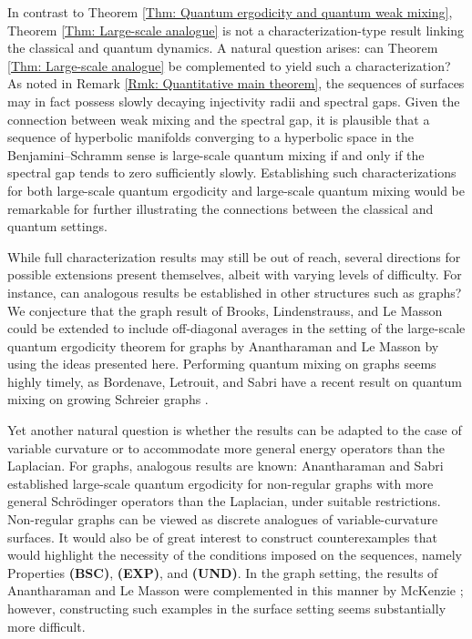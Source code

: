 \documentclass[11pt,twoside,reqno]{amsart} \usepackage{a4wide} \usepackage[T1]{fontenc} \usepackage[utf8]{inputenc} \usepackage{soul}  \usepackage{amsmath} \usepackage{amsfonts} \usepackage{amssymb} \usepackage{mathtools} \usepackage{amsthm} \usepackage{xcolor} \usepackage{graphicx} \usepackage{hyperref} \usepackage{standalone} \usepackage{esint} \usepackage{comment} \usepackage[left=2.3cm,top=3cm,right=2.3cm]{geometry} \usepackage{bm} \usepackage{svg} \usepackage{float} \numberwithin{equation}{section} \theoremstyle{plain} \newtheorem{thm}{Theorem}[section] \newtheorem{theorem}[thm]{Theorem} \newtheorem*{theorem*}{Theorem}\newtheorem{conj}[thm]{Conjecture} \newtheorem{lemma}[thm]{Lemma} \newtheorem{prop}[thm]{Proposition} \newtheorem{proposition}[thm]{Proposition} \newtheorem{cor}[thm]{Corollary} \newtheorem{question}[thm]{Question} \newtheorem{corollary}[thm]{Corollary} \newtheorem{assumption}[thm]{Assumption} \theoremstyle{definition} \newtheorem{defn}[thm]{Definition} \newtheorem{choice}[thm]{Choice} \newtheorem{definition}[thm]{Definition} \newtheorem{ex}[thm]{Example} \newtheorem{notation}[thm]{Notation} \newtheorem*{ack}{Acknowledgements} \theoremstyle{remark} \newtheorem{remark}[thm]{Remark} \newtheorem{bigremark}[thm]{Remark} \usepackage{xcolor} \newcommand{\red}[1]{ {\color{Red}#1} } \newcommand{\blue}[1]{ {\color{Blue}#1} } \author{Kai Hippi} \address{Aalto University, Espoo, Finland} \email{kai.hippi@aalto.fi}
\begin{document}
In contrast to Theorem \ref{Thm: Quantum ergodicity and quantum weak mixing}, Theorem \ref{Thm: Large-scale analogue} is not a characterization-type result linking the classical and quantum dynamics. A natural question arises: can Theorem \ref{Thm: Large-scale analogue} be complemented to yield such a characterization? As noted in Remark \ref{Rmk: Quantitative main theorem}, the sequences of surfaces may in fact possess slowly decaying injectivity radii and spectral gaps. Given the connection between weak mixing and the spectral gap, it is plausible that a sequence of hyperbolic manifolds converging to a hyperbolic space in the Benjamini--Schramm sense is large-scale quantum mixing if and only if the spectral gap tends to zero sufficiently slowly. Establishing such characterizations for both large-scale quantum ergodicity and large-scale quantum mixing would be remarkable for further illustrating the connections between the classical and quantum settings.

While full characterization results may still be out of reach, several directions for possible extensions present themselves, albeit with varying levels of difficulty. For instance, can analogous results be established in other structures such as graphs? We conjecture that the graph result of Brooks, Lindenstrauss, and Le Masson \cite{BLL16} could be extended to include off-diagonal averages in the setting of the large-scale quantum ergodicity theorem for graphs by Anantharaman and Le Masson \cite{AL15} by using the ideas presented here. Performing quantum mixing on graphs seems highly timely, as Bordenave, Letrouit, and Sabri have a recent result on quantum mixing on growing Schreier graphs \cite{BLS26}.

Yet another natural question is whether the results can be adapted to the case of variable curvature or to accommodate more general energy operators than the Laplacian. For graphs, analogous results are known: Anantharaman and Sabri \cite{AS17, AS19} established large-scale quantum ergodicity for non-regular graphs with more general Schrödinger operators than the Laplacian, under suitable restrictions. Non-regular graphs can be viewed as discrete analogues of variable-curvature surfaces. It would also be of great interest to construct counterexamples that would highlight the necessity of the conditions imposed on the sequences, namely Properties \textbf{(BSC)}, \textbf{(EXP)}, and \textbf{(UND)}. In the graph setting, the results of Anantharaman and Le Masson were complemented in this manner by McKenzie \cite{McK22}; however, constructing such examples in the surface setting seems substantially more difficult.
\end{document}
